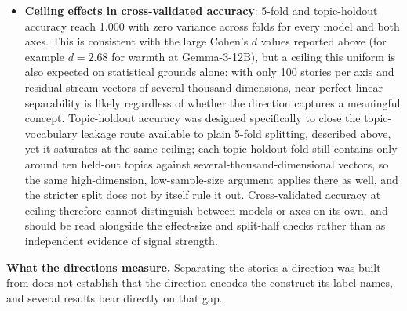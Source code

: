 \documentclass[twocolumn]{article}
\begin{document}
\begin{appendices}
\begin{itemize}[leftmargin=*, itemsep=2pt, topsep=4pt, parsep=0pt]
  reaches 6.27; Gemma-3-27B (2.95 versus 5.10) and Gemma-4-31B (7.56
  versus 11.49) show comparable gaps. This mismatch does not fully explain
  the weak or inverted name-level correlations reported above: Gemma-4-12B
  already reaches a high separability score at its selected layer
  ($d = 8.63$), yet the resulting warmth probe fails to correlate with
  human name ratings ($\rho = +0.009$, n.s.). Story-level separability,
  which guided layer selection, therefore does not guarantee that the
  resulting direction generalizes to bare applicant names, a case the
  training stories never present. Validating or tuning the probe layer
  per model, rather than transferring a single depth from a different
  study, is likely more principled; whether averaging or weighting probe
  projections across several separable layers would recover a stronger
  name-level signal than the single fixed layer is a question we leave
  open.
  \item \textbf{Ceiling effects in cross-validated accuracy}: 5-fold and
  topic-holdout accuracy reach 1.000 with zero variance across folds for
  every model and both axes. This is consistent with the large Cohen's
  $d$ values reported above (for example $d = 2.68$ for warmth at
  Gemma-3-12B), but a ceiling this uniform is also expected on statistical
  grounds alone: with only 100 stories per axis and residual-stream
  vectors of several thousand dimensions, near-perfect linear
  separability is likely regardless of whether the direction captures a
  meaningful concept. Topic-holdout accuracy was designed specifically to
  close the topic-vocabulary leakage route available to plain 5-fold
  splitting, described above, yet it saturates at the same ceiling; each
  topic-holdout fold still contains only around ten held-out topics
  against several-thousand-dimensional vectors, so the same high-dimension,
  low-sample-size argument applies there as well, and the stricter split
  does not by itself rule it out. Cross-validated accuracy at ceiling
  therefore cannot distinguish between models or axes on its own, and
  should be read alongside the effect-size and split-half checks rather
  than as independent evidence of signal strength.
\end{itemize}

\smallskip\noindent\textbf{What the directions measure.}
Separating the stories a direction was built from does not establish that
the direction encodes the construct its label names, and several results
bear directly on that gap.


\end{appendices}
\end{document}
